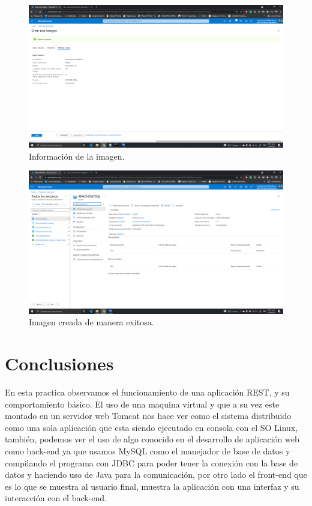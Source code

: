 \documentclass[11pt]{article}
\begin{document}
		\begin{figure}[H]
			\centering
			\includegraphics[scale=0.34]{resources/imagenvm3.png}
			\caption{Información de la imagen.}\label{fig:picture}
		\end{figure}
		\begin{figure}[H]
			\centering
			\includegraphics[scale=0.34]{resources/imagenvOK.png}
			\caption{Imagen creada de manera exitosa.}\label{fig:picture}
		\end{figure}
		\section{Conclusiones}
	En esta practica observamos el funcionamiento de una aplicación REST, y su comportamiento básico. El uso de una maquina virtual y que a su vez este montado en un servidor web Tomcat nos hace ver como el sistema distribuido como una sola aplicación que esta siendo ejecutado en consola con el SO Linux, también, podemos ver el uso de algo conocido en el desarrollo de aplicación web como back-end ya que usamos MySQL como el manejador de base de datos y compilando el programa con JDBC para poder tener la conexión con la base de datos y haciendo uso de Java para la comunicación, por otro lado el front-end que es lo que se muestra al usuario final, muestra la aplicación con una interfaz y su interacción con el back-end.
\end{document}
